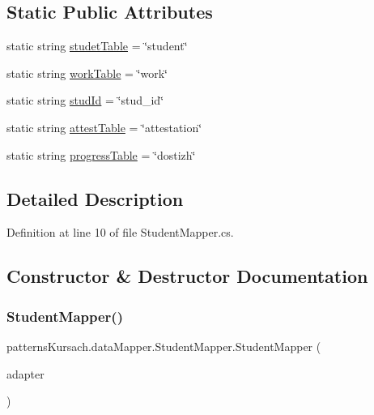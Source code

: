 \subsection*{Static Public Attributes}
\begin{DoxyCompactItemize}
\item 
static string \mbox{\hyperlink{classpatterns_kursach_1_1data_mapper_1_1_student_mapper_ad678c8b864d3da39d5890e1cc45df311}{studet\+Table}} = \char`\"{}student\char`\"{}
\item 
static string \mbox{\hyperlink{classpatterns_kursach_1_1data_mapper_1_1_student_mapper_a3573887067377c52a2968aacef8c5b40}{work\+Table}} = \char`\"{}work\char`\"{}
\item 
static string \mbox{\hyperlink{classpatterns_kursach_1_1data_mapper_1_1_student_mapper_ae49cbe5b9a16a1e9b0850e3b2a15ec06}{stud\+Id}} = \char`\"{}stud\+\_\+id\char`\"{}
\item 
static string \mbox{\hyperlink{classpatterns_kursach_1_1data_mapper_1_1_student_mapper_adb1a94d8efc531676eb084769e7b0025}{attest\+Table}} = \char`\"{}attestation\char`\"{}
\item 
static string \mbox{\hyperlink{classpatterns_kursach_1_1data_mapper_1_1_student_mapper_a096afdad2ca923edf64c677e8b45c190}{progress\+Table}} = \char`\"{}dostizh\char`\"{}
\end{DoxyCompactItemize}


\subsection{Detailed Description}


Definition at line 10 of file Student\+Mapper.\+cs.



\subsection{Constructor \& Destructor Documentation}
\mbox{\label{classpatterns_kursach_1_1data_mapper_1_1_student_mapper_abe2ee2a1d99ec8a670b06e14bf485978}} 
\subsubsection{\texorpdfstring{Student\+Mapper()}{StudentMapper()}}
{\footnotesize\ttfamily patterns\+Kursach.\+data\+Mapper.\+Student\+Mapper.\+Student\+Mapper (\begin{DoxyParamCaption}\item[{\mbox{\hyperlink{classpatterns_kursach_1_1_storage_adapter}{Storage\+Adapter}}}]{adapter }\end{DoxyParamCaption})}



